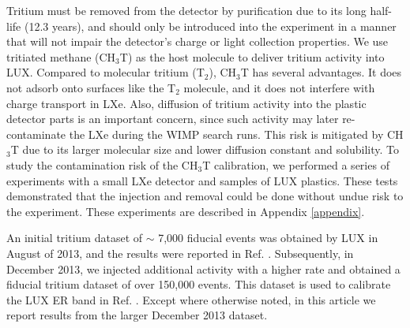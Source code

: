 Tritium must be removed from the detector by purification due to its long half-life (12.3 years\cite{Tritium_halflife_all}), and should only be introduced into the experiment in a manner that will not impair the detector's charge or light collection properties. We use tritiated methane (CH$_3$T) as the host molecule to deliver tritium activity into LUX. Compared to molecular tritium (T$_2$), CH$_3$T has several advantages. It does not adsorb onto surfaces like the T$_2$ molecule, and it does not interfere with charge transport in LXe. Also, diffusion of tritium activity into the plastic detector parts is an important concern, since such activity may later re-contaminate the LXe during the WIMP search runs.  This risk is mitigated by CH$_3$T due to its larger molecular size and lower diffusion constant and solubility. To study the contamination risk of the CH$_3$T calibration, we performed a series of experiments with a small LXe detector and samples of LUX plastics. These tests demonstrated that the injection and removal could be done without undue risk to the experiment. These experiments are described in Appendix \ref{appendix}.

An initial tritium dataset of $\sim$ 7,000 fiducial events was obtained by LUX in August of 2013, and the results were reported in Ref. \cite{lux-results}. Subsequently, in December 2013, we injected additional activity with a higher rate and obtained a fiducial tritium dataset of over 150,000 events. This dataset is used to calibrate the LUX ER band in Ref. \cite{lux-reanalysis}. Except where otherwise noted, in this article we report results from the larger December 2013 dataset.